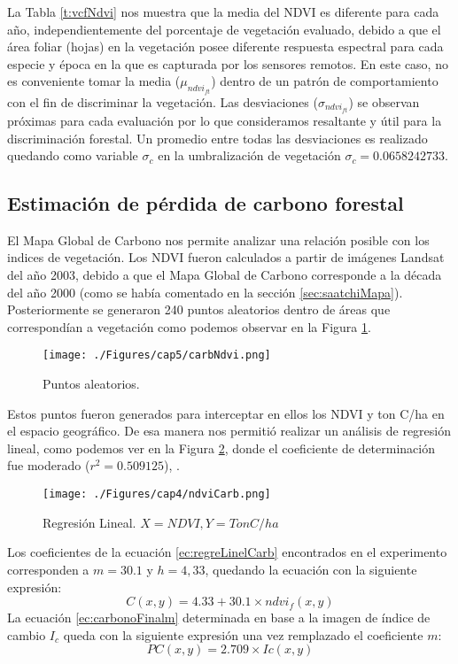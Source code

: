 La Tabla \ref{t:vcfNdvi} nos muestra que la media del NDVI es diferente para cada a\~{n}o, independientemente del porcentaje de vegetaci\'on evaluado, debido a que el \'area foliar (hojas) en la vegetaci\'on posee diferente respuesta espectral para cada especie y \'epoca en la que es capturada por los sensores remotos. En este caso, no es conveniente tomar la media ($  \mu_{ndvi_{ft}} $) dentro de un patr\'on de comportamiento con el fin de discriminar la vegetaci\'on. Las desviaciones ($ \sigma_{ndvi_{ft}} $) se observan pr\'oximas para cada evaluaci\'on por lo que consideramos resaltante y \'util para la discriminaci\'on forestal. Un promedio entre todas las desviaciones es realizado quedando como variable $ \sigma_{c} $ en la umbralizaci\'on de vegetaci\'on  $ \sigma_{c} = 0.0658242733 $.
\subsection{Estimaci\'on de p\'erdida de carbono forestal}\label{subsec:estimacionCarbono}
El Mapa Global de Carbono nos permite analizar una relaci\'on posible con los indices de vegetaci\'on. Los NDVI fueron calculados a partir de im\'agenes Landsat del a\~{n}o 2003, debido a que el Mapa Global de Carbono corresponde a la d\'ecada del a\~{n}o 2000 (como se hab\'ia comentado en la secci\'on \ref{sec:saatchiMapa}). Posteriormente se generaron 240 puntos aleatorios dentro de \'areas que correspond\'ian a vegetaci\'on como podemos observar en la Figura \ref{fig:aleatorioCrb}.
\begin{figure}[H]
	\centering
	\texttt{[image: ./Figures/cap5/carbNdvi.png]}
	\caption{Puntos aleatorios.}
	\label{fig:aleatorioCrb}
\end{figure}
Estos puntos fueron generados para interceptar en ellos los NDVI y ton C/ha en el espacio geogr\'afico. De esa manera nos permiti\'o realizar un an\'alisis de regresi\'on lineal, como podemos ver en la Figura \ref{fig:linealCar}, donde el coeficiente de determinaci\'on fue moderado ($ r^{2}=0.509125 $), .
\begin{figure}[H]
	\centering
	\texttt{[image: ./Figures/cap4/ndviCarb.png]}
	\caption{Regresi\'on Lineal. $ X=NDVI, Y=TonC/ha $}
	\label{fig:linealCar}
\end{figure}
Los coeficientes de la ecuaci\'on \ref{ec:regreLinelCarb} encontrados en el experimento corresponden a $ m=30.1 $ y $ h =4,33 $, quedando la ecuaci\'on con la siguiente expresi\'on:
\begin{equation}\label{ec:regreLinelCarbExp}
C(x,y)=4.33+30.1 \times ndvi_{f}(x,y)
\end{equation}
La ecuaci\'on \ref{ec:carbonoFinalm} determinada en base a la imagen de \'indice de cambio $ I_{c} $ queda con la siguiente expresi\'on una vez remplazado el coeficiente $ m $:
 \begin{equation}\label{ec:carbonoFinalmExp}
 PC(x,y) = 2.709 \times Ic(x,y)
 \end{equation}


